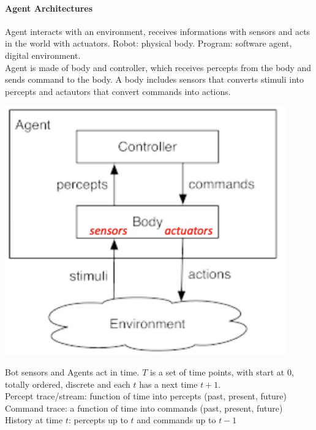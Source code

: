 \documentclass[10pt]{report}
\begin{document}
\paragraph{Agent Architectures} Agent interacts with an environment, receives informations with sensors and acts in the world with actuators. Robot: physical body. Program: software agent, digital environment.\\
Agent is made of body and controller, which receives percepts from the body and sends command to the body. A body includes sensors that converts stimuli into percepts and actautors that convert commands into actions.
\begin{center}
	\includegraphics[scale=0.5]{3.png}
\end{center}
Bot sensors and %
Agents act in time. $T$ is a set of time points, with start at 0, totally ordered, discrete and each $t$ has a next time $t+1$.\\
Percept trace/stream: function of time into percepts (past, present, future)\\
Command trace: a function of time into commands (past, present, future)\\
History at time $t$: percepts up to $t$ and commands up to $t-1$
\end{document}
